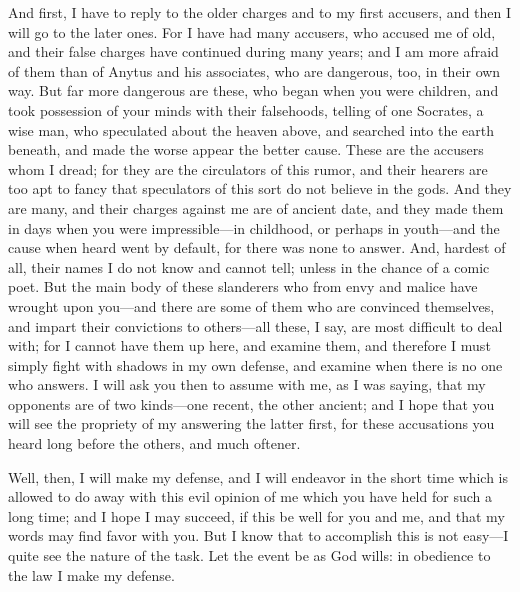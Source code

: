 \documentclass[12pt]{article}
\begin{document}
And first, I have to reply to the older charges and to my first accusers,
and then I will go to the later ones. For I have had many accusers,
who accused me of old, and their false charges have continued during
many years; and I am more afraid of them than of Anytus and his associates,
who are dangerous, too, in their own way. But far more dangerous are
these, who began when you were children, and took possession of your
minds with their falsehoods, telling of one Socrates, a wise man,
who speculated about the heaven above, and searched into the earth
beneath, and made the worse appear the better cause. These are the
accusers whom I dread; for they are the circulators of this rumor,
and their hearers are too apt to fancy that speculators of this sort
do not believe in the gods. And they are many, and their charges against
me are of ancient date, and they made them in days when you were
impressible---in childhood, or perhaps in youth---and the cause when heard went
by default, for there was none to answer. And, hardest of all, their
names I do not know and cannot tell; unless in the chance of a comic
poet. But the main body of these slanderers who from envy and malice
have wrought upon you---and there are some of them who are convinced
themselves, and impart their convictions to others---all these, I
say, are most difficult to deal with; for I cannot have them up here,
and examine them, and therefore I must simply fight with shadows in
my own defense, and examine when there is no one who answers. I will
ask you then to assume with me, as I was saying, that my opponents
are of two kinds---one recent, the other ancient; and I hope that
you will see the propriety of my answering the latter first, for these
accusations you heard long before the others, and much oftener.

Well, then, I will make my defense, and I will endeavor in the short time which
is allowed to do away with this evil opinion of me which you have held for such
a long time; and I hope I may succeed, if this be well for you and me, and that
my words may find favor with you. But I know that to accomplish this is not
easy---I quite see the nature of the task. Let the event be as God wills: in
obedience to the law I make my defense.
\end{document}
